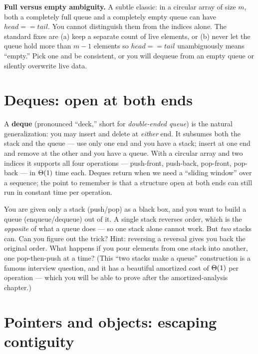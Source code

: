 \begin{trapbox}
\textbf{Full versus empty ambiguity.} A subtle classic: in a circular array of size $m$, both a completely full queue and a completely empty queue can have $head == tail$. You cannot distinguish them from the indices alone. The standard fixes are (a) keep a separate count of live elements, or (b) never let the queue hold more than $m-1$ elements so $head == tail$ unambiguously means ``empty.'' Pick one and be consistent, or you will dequeue from an empty queue or silently overwrite live data.
\end{trapbox}

\section{Deques: open at both ends}
\label{ch10:deque}

A \textbf{deque} (pronounced ``deck,'' short for \emph{double-ended queue}) is the natural generalization: you may insert and delete at \emph{either} end. It subsumes both the stack and the queue --- use only one end and you have a stack; insert at one end and remove at the other and you have a queue. With a circular array and two indices it supports all four operations --- push-front, push-back, pop-front, pop-back --- in $\Theta(1)$ time each. Deques return when we need a ``sliding window'' over a sequence; the point to remember is that a structure open at both ends can still run in constant time per operation.

\begin{walkbox}
You are given only a stack (push/pop) as a black box, and you want to build a queue (enqueue/dequeue) out of it. A single stack reverses order, which is the \emph{opposite} of what a queue does --- so one stack alone cannot work. But \emph{two} stacks can. Can you figure out the trick? Hint: reversing a reversal gives you back the original order. What happens if you pour elements from one stack into another, one pop-then-push at a time? (This ``two stacks make a queue'' construction is a famous interview question, and it has a beautiful amortized cost of $\Theta(1)$ per operation --- which you will be able to prove after the amortized-analysis chapter.)
\end{walkbox}

\section{Pointers and objects: escaping contiguity}
\label{ch10:pointers}

